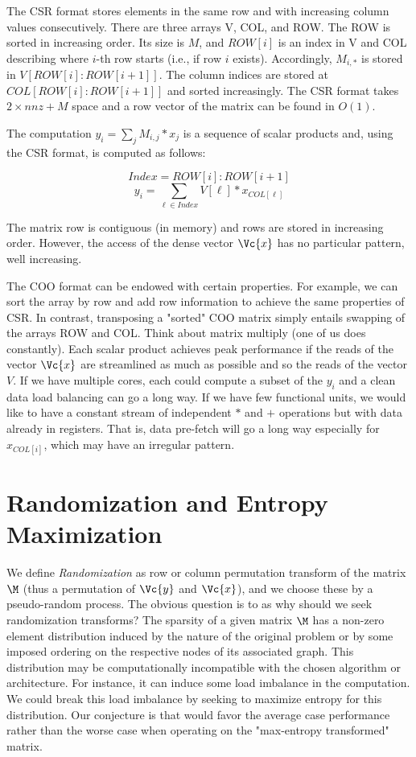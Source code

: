\documentclass[acmsmall]{acmart}
\begin{document}
The CSR format stores elements in the same row and with increasing
column values consecutively. There are three arrays V, COL, and
ROW. The ROW is sorted in increasing order.  Its size is $M$, and
$ROW[i]$ is an index in V and COL describing where $i$-th row starts
(i.e., if row $i$ exists).  Accordingly, $M_{i,*}$ is stored in
$V[ROW[i]:ROW[i+1]]$. The column indices are stored at
$COL[ROW[i]:ROW[i+1]]$ and sorted increasingly. The CSR format takes
$2\times nnz + M$ space and a row vector of the matrix can be found in
$O(1)$.

The computation  $y_i = \sum_j M_{i,j}*x_j$ is a sequence of scalar
products and, using the CSR format, is computed as follows:

\[ Index = ROW[i]:ROW[i+1] \]
\[
y_i =  \sum_{\ell\in Index} V[\ell] * x_{COL[\ell]}  
\]

The matrix row is contiguous (in memory) and rows are stored in
increasing order. However, the access of the dense vector $\Vc{x}$ has
no particular pattern, well increasing.

The COO format can be endowed with certain properties. For example, we
can sort the array by row and add row information to achieve the same
properties of CSR. In contrast, transposing a "sorted" COO matrix
simply entails swapping of the arrays ROW and COL. Think about matrix
multiply (one of us does constantly).  Each scalar product achieves
peak performance if the reads of the vector $\Vc{x}$ are streamlined
as much as possible and so the reads of the vector $V$. If we have
multiple cores, each could compute a subset of the $y_i$ and a clean
data load balancing can go a long way. If we have few functional
units, we would like to have a constant stream of independent $*$ and
$+$ operations but with data already in registers. That is, data
pre-fetch will go a long way especially for $x_{COL[i]}$, which may
have an irregular pattern.


\section{Randomization and Entropy Maximization}
\label{sec:randomization}
We define {\em Randomization} as row or column permutation transform
of the matrix $\M$ (thus a permutation of $\Vc{y}$ and $\Vc{x}$), and
we choose these by a pseudo-random process. The obvious question is to
as why should we seek randomization transforms?  The sparsity of
a given matrix $\M$ has a non-zero element distribution induced by the
nature of the original problem or by some imposed ordering on the
respective nodes of its associated graph.  This distribution may be
computationally incompatible with the chosen algorithm or
architecture. For instance, it can induce some load imbalance in the
computation.  We could break this load imbalance by seeking to
maximize entropy for this distribution. Our conjecture is that would
favor the average case performance rather than the worse case when
operating on the "max-entropy transformed" matrix.
\end{document}
